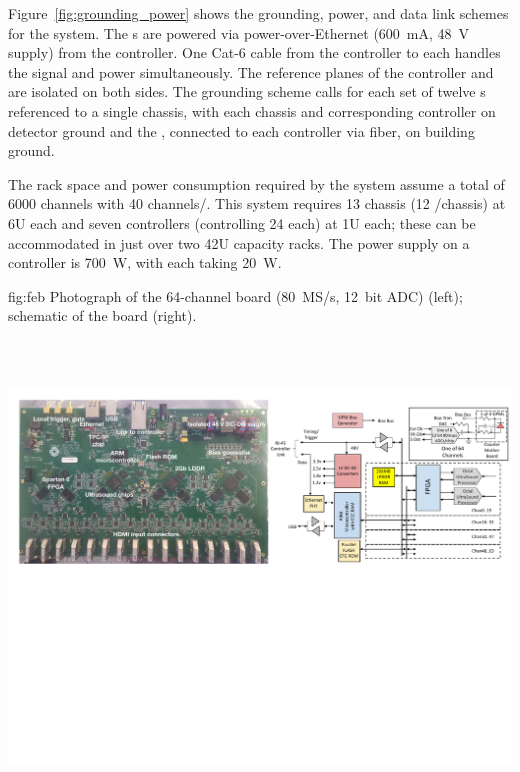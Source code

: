 Figure~\ref{fig:grounding_power} shows the grounding, power, and data link schemes for the system. The s are powered via power-over-Ethernet (\SI{600}{mA}, \SI{48}{V} supply) from the controller. One Cat-6 cable from the controller to each  handles the signal and power simultaneously. The reference planes of the controller and  are isolated on both sides. The grounding scheme calls for each set of twelve s referenced to a single chassis, with each chassis and corresponding controller on detector ground and the , connected to each controller via fiber, on building ground. 
 
The rack space and power consumption required by the system assume
a total of 6000 channels with 40 channels/. This system requires 13 chassis (12 /chassis) at 6U each and seven controllers (controlling 24  each) at 1U each; these can be accommodated in just over two 42U capacity racks. The power supply on a controller is \SI{700}{W}, with each  taking \SI{20}{W}. 
 

\begin{dunefigure}
 {fig:feb}
 {Photograph of the 64-channel   board (\SI{80}{MS/s}, \SI{12}{bit} ADC) (left); schematic of the  board (right).}
\includegraphics[height=5.2in]{graphics/pds-feb-tdr.pdf} 
\vspace{-6.3cm}
\end{dunefigure}

